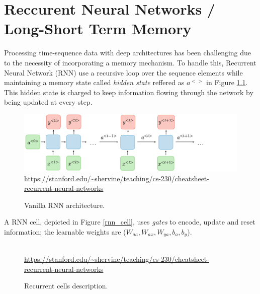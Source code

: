 \documentclass[12pt, a4paper]{report}
\begin{document}
	\chapter{Reccurent Neural Networks / Long-Short Term Memory}\label{appendix_b}
		Processing time-sequence data with deep architectures has been challenging due to the necessity of incorporating a memory mechanism.
		To handle this, Recurrent Neural Network (RNN) use a recursive loop over the sequence elements while maintaining a memory state called {\itshape hidden state} reffered as {\itshape $a^{<>}$} in Figure \ref{rnn}.
		This hidden state is charged to keep information flowing through the network by being updated at every step.
		\begin{figure}[h!]
			\centering
			\includegraphics[width=1.\textwidth]{architecture-rnn-ltr.png}
			{\tiny \url{https://stanford.edu/~shervine/teaching/cs-230/cheatsheet-recurrent-neural-networks}}
			\caption{Vanilla RNN architecture.}
			\label{rnn}
		\end{figure}
		A RNN cell, depicted in Figure \ref{rnn_cell}, uses {\itshape gates} to encode, update and reset information; the learnable weights are ({\itshape $W_{aa},W_{ax},W_{ya},b_{a},b_{y}$}).
		\begin{figure}[h!]
			\centering
			\hfill
			 \\
			{\tiny \url{https://stanford.edu/~shervine/teaching/cs-230/cheatsheet-recurrent-neural-networks}}
			\caption{Recurrent cells description.}
		\end{figure}
\end{document}

